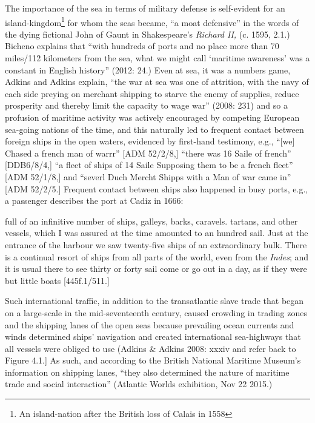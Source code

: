 \begin{styleStandard}
The importance of the sea in terms of military defense is self-evident for an island-kingdom\footnote{ An island-nation after the British loss of Calais in 1558} for whom the seas became, “a moat defensive” in the words of the dying fictional John of Gaunt in Shakespeare’s \textit{Richard II, }(c. 1595, 2.1.) Bicheno explains that “with hundreds of ports and no place more than 70 miles/112 kilometers from the sea, what we might call ‘maritime awareness’ was a constant in English history” (2012: 24.) Even at sea, it was a numbers game, Adkins and Adkins explain, “the war at sea was one of attrition, with the navy of each side preying on merchant shipping to starve the enemy of supplies, reduce prosperity and thereby limit the capacity to wage war” (2008: 231) and so a profusion of maritime activity was actively encouraged by competing European sea-going nations of the time, and this naturally led to frequent contact between foreign ships in the open waters, evidenced by first-hand testimony, e.g., “[we] Chased a french man of warrr” [ADM 52/2/8,] “there was 16 Saile of french” [DDB6/8/4,] “a fleet of ships of 14 Saile Supposing them to be a french fleet” [ADM 52/1/8,] and “severl Duch Mercht Shipps with a Man of war came in” [ADM 52/2/5.] Frequent contact between ships also happened in busy ports, e.g., a passenger describes the port at Cadiz in 1666:
\end{styleStandard}


\begin{styleStandard}
full of an infinitive number of ships, galleys, barks, caravels. tartans, and other vessels, which I was assured at the time amounted to an hundred sail. Just at the entrance of the harbour we saw twenty-five ships of an extraordinary bulk. There is a continual resort of ships from all parts of the world, even from the \textit{Indes}; and it is usual there to see thirty or forty sail come or go out in a day, as if they were but little boats [445f.1/511.] 
\end{styleStandard}


\begin{styleStandard}
Such international traffic, in addition to the transatlantic slave trade that began on a large-scale in the mid-seventeenth century, caused crowding in trading zones and the shipping lanes of the open seas because prevailing ocean currents and winds determined ships’ navigation and created international sea-highways that all vessels were obliged to use (Adkins \& Adkins 2008: xxxiv and refer back to Figure 4.1.] As such, and according to the British National Maritime Museum’s information on shipping lanes, “they also determined the nature of maritime trade\textit{ }and social interaction” (Atlantic Worlds exhibition, Nov 22 2015.) \ 
\end{styleStandard}


